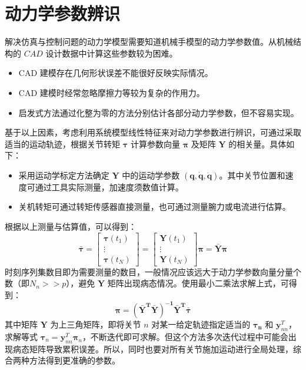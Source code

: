 \documentclass[cn,11pt,chinese,blue,bibstyle=ieeetr]{elegantbook}
\begin{document}
\section{动力学参数辨识}

解决仿真与控制问题的动力学模型需要知道机械手模型的动力学参数值。从机械结构的 $CAD$ 设计数据中计算这些参数较为困难。
\begin{itemize}
\item CAD 建模存在几何形状误差不能很好反映实际情况。
\item CAD 建模时经常忽略摩擦力等较为复杂的作用力。
\item 启发式方法通过化整为零的方法分别估计各部分动力学参数，但不容易实现。
\end{itemize}

基于以上因素，考虑利用系统模型线性特征来对动力学参数进行辨识，可通过采取适当的运动轨迹，根据关节转矩 $\bm{\tau}$ 计算参数向量 $\bm{\pi}$ 及矩阵 $\bm Y$ 的相关量。具体如下：
\begin{itemize}
	\item 采用运动学标定方法确定 $\bm{Y}$ 中的运动学参数 $(\bm{q, \dot{q}, \ddot{q}})$。其中关节位置和速度可通过工具实际测量，加速度须数值计算。
	\item 关机转矩可通过转矩传感器直接测量，也可通过测量腕力或电流进行估算。
\end{itemize}

根据以上测量与估算值，可以得到：
\begin{equation}
\bm{\bar{\tau}} = 
\begin{bmatrix}
\bm \tau(t_1) \\
\vdots \\
\bm \tau(t_N)
\end{bmatrix} =
\begin{bmatrix}
\bm Y (t_1) \\
\vdots \\
\bm Y (t_N)
\end{bmatrix} \bm{\pi} = \bm{\bar{Y} \pi}
\end{equation}
时刻序列集数目即为需要测量的数目，一般情况应该远大于动力学参数向量分量个数（即$N_n >> p$），避免 $\bm{Y}$ 矩阵出现病态情况。使用最小二乘法求解上式，可得到：
\begin{equation}
\bm{\pi = (\bar{Y}^T\bar{Y})^{-1}\bar{Y}^T\bar{\tau}}
\end{equation}
其中矩阵 $\bm{Y}$ 为上三角矩阵，即将关节 $n$ 对某一给定轨迹指定适当的 $\bm{\tau_n}$ 和 $\bm{y}_{nn}^T$，求解等式 $\bm{\tau}_n = \bm{y}_{nn}^T\bm{\pi}_n$，不断迭代即可求解。但这个方法多次迭代过程中可能会出现病态矩阵导致累积误差。所以，同时也要对所有关节施加运动进行全局处理，综合两种方法得到更准确的参数。
\end{document}
